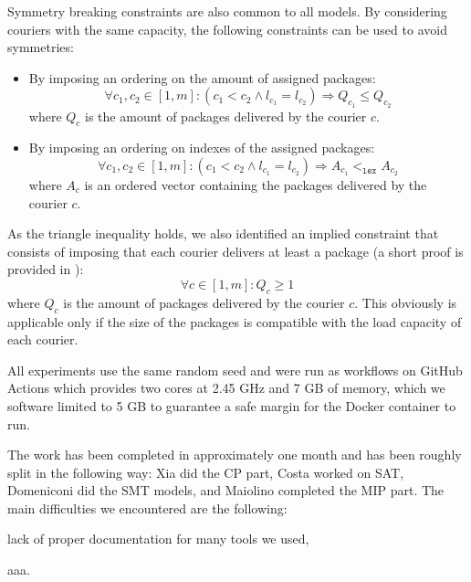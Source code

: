 \documentclass{article}
\begin{document}
    Symmetry breaking constraints are also common to all models. By considering couriers with the same capacity, the following constraints can be used to avoid symmetries:
    \begin{itemize}
        \item By imposing an ordering on the amount of assigned packages:
            \begin{equation}
                \label{eq:cp_symm_amount}
                \forall c_1, c_2 \in [1, m]: (c_1 < c_2 \land l_{c_1} = l_{c_2}) \Rightarrow Q_{c_1} \leq Q_{c_2}
            \end{equation}
            where $Q_c$ is the amount of packages delivered by the courier $c$.
        \item By imposing an ordering on indexes of the assigned packages:
            \begin{equation}
                \label{eq:cp_symm_packs}
                \forall c_1, c_2 \in [1, m]: (c_1 < c_2 \land l_{c_1} = l_{c_2}) \Rightarrow A_{c_1} <_\texttt{lex} A_{c_2}
            \end{equation}
            where $A_c$ is an ordered vector containing the packages delivered by the courier $c$.
    \end{itemize}

    As the triangle inequality holds, we also identified an implied constraint that consists of imposing that each courier delivers at least a package (a short proof is provided in ):
    \begin{equation}
        \label{eq:impl_constr}
        \forall c \in [1, m]: Q_c \geq 1  
    \end{equation}
    where $Q_c$ is the amount of packages delivered by the courier $c$.
    This obviously is applicable only if the size of the packages is compatible with the load capacity of each courier.

    All experiments use the same random seed and were run as workflows on GitHub Actions which provides two cores at 2.45 GHz and 7 GB of memory, which we software limited to 5 GB to guarantee a safe margin for the Docker container to run.

    The work has been completed in approximately one month and has been roughly split in the following way: Xia did the CP part, Costa worked on SAT, Domeniconi did the SMT models, and Maiolino completed the MIP part. The main difficulties we encountered are the following: 
    \begin{enumerate*}[label=(\roman*)]
        \item lack of proper documentation for many tools we used,
        \item aaa.
    \end{enumerate*}
\end{document}

